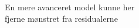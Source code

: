 \documentclass[preview]{standalone}
\begin{document}
\begin{center}
En mere avanceret model kunne her \\ fjerne mønstret fra residualerne
\end{center}
\end{document}
